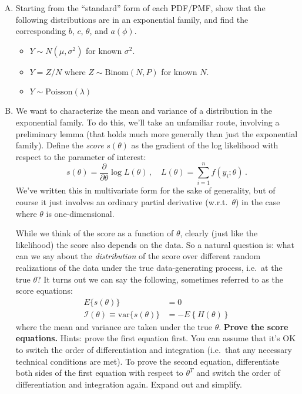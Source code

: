 \documentclass[11pt]{article}
\begin{document}
\begin{enumerate}[(A)]

\item Starting from the ``standard'' form of each PDF/PMF, show that the following distributions are in an exponential family, and find the corresponding $b$, $c$, $\theta$, and $a(\phi)$.  

\begin{itemize}
\item $Y \sim N(\mu, \sigma^2)$ for known $\sigma^2$.  
\item $Y = Z/N$ where $Z \sim \mbox{Binom}(N, P)$ for known $N$.   
\item $Y \sim \mbox{Poisson}(\lambda)$  
\end{itemize}

\item We want to characterize the mean and variance of a distribution in the exponential family.  To do this, we'll take an unfamiliar route, involving a preliminary lemma (that holds much more generally than just the exponential family).  Define the \emph{score} $s(\theta)$ as the gradient of the log likelihood with respect to the parameter of interest:  
$$
s(\theta) = \frac{\partial}{\partial \theta} \log L(\theta) \, , \quad L(\theta) = \sum_{i=1}^n f(y_i; \theta) \, .
$$
We've written this in multivariate form for the sake of generality, but of course it just involves an ordinary partial derivative (w.r.t.~$\theta$) in the case where $\theta$ is one-dimensional.

While we think of the score as a function of $\theta$, clearly (just like the likelihood) the score also depends on the data.  So a natural question is: what can we say about the \emph{distribution} of the score over different random realizations of the data under the true data-generating process, i.e.~at the true $\theta$?  It turns out we can say the following, sometimes referred to as the score equations:  
$$
\begin{aligned}
E\{ s(\theta) \} &= 0 \\
\mathcal{I}(\theta) \equiv \mbox{var} \{ s(\theta) \}  &= - E \left\{ H(\theta) \right\}
\end{aligned}
$$
where the mean and variance are taken under the true $\theta$.  \textbf{Prove the score equations.}  Hints: prove the first equation first.  You can assume that it's OK to switch the order of differentiation and integration (i.e.~that any necessary technical conditions are met).  To prove the second equation, differentiate both sides of the first equation with respect to $\theta^T$ and switch the order of differentiation and integration again.  Expand out and simplify.  


\end{enumerate}
\end{document}
